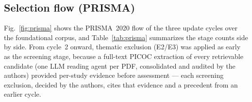 \documentclass{ieeeaccess}
\begin{document}
\subsection{Selection flow (PRISMA)}
\label{sec:prisma}

Fig.~\ref{fig:prisma} shows the PRISMA~2020 flow of the three update
cycles over the foundational corpus, and Table~\ref{tab:prisma}
summarizes the stage counts side by side. From cycle~2 onward, thematic
exclusion (E2/E3) was applied as early as the screening stage, because a
full-text PICOC extraction of every retrievable candidate (one LLM
reading agent per PDF, consolidated and audited by the authors)
provided per-study evidence before assessment --- each screening
exclusion, decided by the authors, cites that evidence and a precedent
from an earlier cycle.
\end{document}
